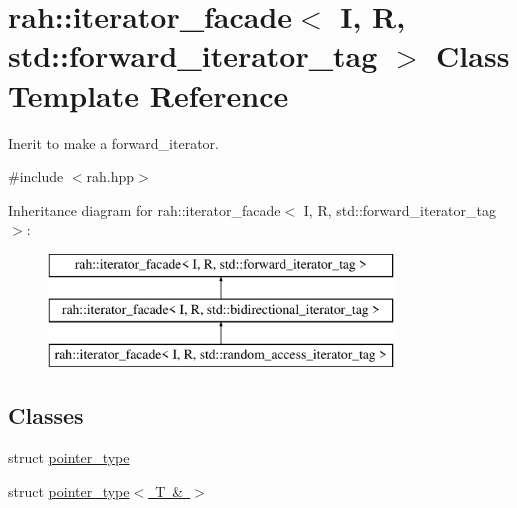 \hypertarget{structrah_1_1iterator__facade_3_01_i_00_01_r_00_01std_1_1forward__iterator__tag_01_4}{}\section{rah\+::iterator\+\_\+facade$<$ I, R, std\+::forward\+\_\+iterator\+\_\+tag $>$ Class Template Reference}
\label{structrah_1_1iterator__facade_3_01_i_00_01_r_00_01std_1_1forward__iterator__tag_01_4}


Inerit to make a forward\+\_\+iterator.  




{\ttfamily \#include $<$rah.\+hpp$>$}

Inheritance diagram for rah\+::iterator\+\_\+facade$<$ I, R, std\+::forward\+\_\+iterator\+\_\+tag $>$\+:\begin{figure}[H]
\begin{center}
\leavevmode
\includegraphics[height=3.000000cm]{structrah_1_1iterator__facade_3_01_i_00_01_r_00_01std_1_1forward__iterator__tag_01_4}
\end{center}
\end{figure}
\subsection*{Classes}
\begin{DoxyCompactItemize}
\item 
struct \mbox{\hyperlink{structrah_1_1iterator__facade_3_01_i_00_01_r_00_01std_1_1forward__iterator__tag_01_4_1_1pointer__type}{pointer\+\_\+type}}
\item 
struct \mbox{\hyperlink{structrah_1_1iterator__facade_3_01_i_00_01_r_00_01std_1_1forward__iterator__tag_01_4_1_1pointer__type_3_01_t_01_6_01_4}{pointer\+\_\+type$<$ T \& $>$}}
\end{DoxyCompactItemize}
